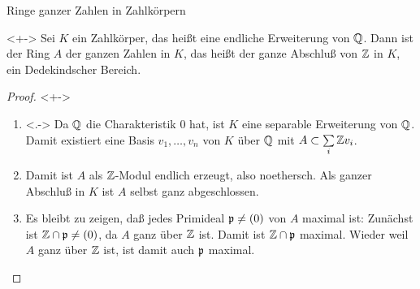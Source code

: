 \begin{frame}{Ringe ganzer Zahlen in Zahlkörpern}
	\begin{theorem}<+->
		Sei \(K\) ein Zahlkörper, das heißt eine endliche Erweiterung von
		\(\mathbb Q\). Dann ist der Ring \(A\) der ganzen Zahlen in \(K\), das
		heißt der ganze Abschluß von \(\mathbb Z\) in \(K\), ein Dedekindscher
		Bereich.
	\end{theorem}
	\begin{proof}<+->
		\begin{enumerate}[<+->]
		\item<.->
			Da \(\mathbb Q\) die Charakteristik \(0\) hat, 
			ist \(K\) eine separable Erweiterung von
			\(\mathbb Q\). Damit existiert eine Basis \(v_1, \dotsc, v_n\) von
			\(K\) über \(\mathbb Q\) mit \(A \subset \sum\limits_i \mathbb Z v_i\).
		\item
			Damit ist \(A\) als \(\mathbb Z\)-Modul endlich erzeugt, also
			noethersch. Als ganzer Abschluß in \(K\) ist \(A\) selbst ganz
			abgeschlossen.
		\item
			Es bleibt zu zeigen, daß jedes Primideal \(\mathfrak{p} \neq (0)\) von
			\(A\) maximal ist: Zunächst ist \(\mathbb Z \cap \mathfrak{p} \neq (0)\),
			da \(A\) ganz über \(\mathbb Z\) ist. Damit ist \(\mathbb Z \cap \mathfrak{p}\)
			maximal. Wieder weil \(A\) ganz über \(\mathbb Z\) ist, ist damit
			auch \(\mathfrak{p}\) maximal.
			\qedhere
		\end{enumerate}
	\end{proof}
\end{frame}


